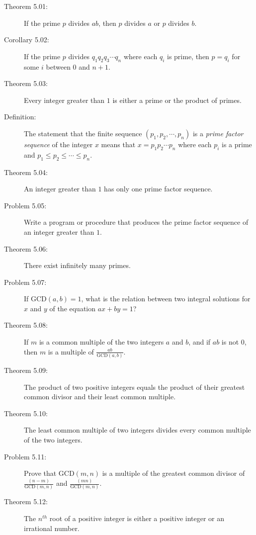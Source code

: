 \documentclass{article}
\begin{document}
\begin{description}

  \item[Theorem 5.01:] If the prime $p$ divides $ab$, then $p$ divides $a$ or $p$ divides $b$.

  \item[Corollary 5.02:] If the prime $p$ divides $q_1 q_2 q_3 \cdots q_n$ where each $q_i$ is prime, then $p=q_i$ for some $i$ between $0$ and $n+1$.

  \item[Theorem 5.03:] Every integer greater than $1$ is either a prime or the product of primes.

  \item[Definition:] The statement that the finite sequence $(p_1, p_2, \cdots, p_n)$ is a \emph{prime factor sequence} of the integer $x$ means that $x = p_1 p_2 \cdots p_n$ where each $p_i$ is a prime and $p_1 \leq p_2 \leq \cdots \leq p_n$.

  \item[Theorem 5.04:] An integer greater than $1$ has only one prime factor sequence.

  \item[Problem 5.05:] Write a program or procedure that produces the prime factor sequence of an integer greater than $1$.

  \item[Theorem 5.06:] There exist infinitely many primes.

  \item[Problem 5.07:] If $\text{GCD}(a,b) = 1$, what is the relation between two integral solutions for $x$ and $y$ of the equation $ax+by=1$?

  \item[Theorem 5.08:] If $m$ is a common multiple of the two integers $a$ and $b$, and if $ab$ is not $0$, then $m$ is a multiple of $\frac{ab}{ \text{GCD}(a,b) }$.

  \item[Theorem 5.09:] The product of two positive integers equals the product of their greatest common divisor and their least common multiple.

  \item[Theorem 5.10:] The least common multiple of two integers divides every common multiple of the two integers.

  \item[Problem 5.11:] Prove that $\text{GCD}(m,n)$ is a multiple of the greatest common divisor of $\frac{(n-m)}{ \text{GCD}(m,n) }$ and $\frac{(mn)}{ \text{GCD}(m,n) }$.

  \item[Theorem 5.12:] The $n^{th}$ root of a positive integer is either a positive integer or an irrational number.

\end{description}
\end{document}
